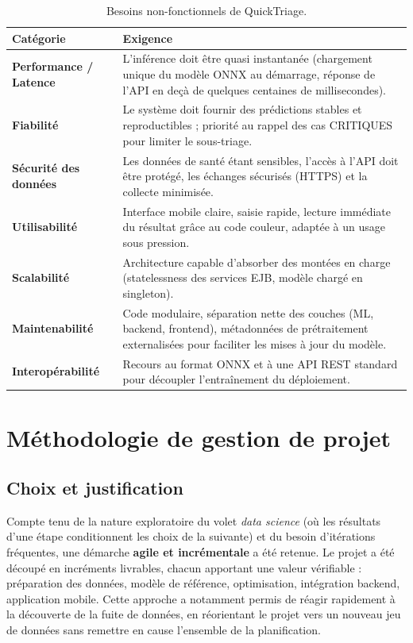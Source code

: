 \begin{table}[h]
\centering
\renewcommand{\arraystretch}{1.3}
\begin{tabular}{p{3.2cm} p{10.6cm}}
\toprule
\textbf{Catégorie} & \textbf{Exigence} \\
\midrule
\textbf{Performance / Latence} & L'inférence doit être quasi instantanée (chargement unique
du modèle ONNX au démarrage, réponse de l'API en deçà de quelques centaines de
millisecondes). \\
\textbf{Fiabilité} & Le système doit fournir des prédictions stables et reproductibles ;
priorité au rappel des cas CRITIQUES pour limiter le sous-triage. \\
\textbf{Sécurité des données} & Les données de santé étant sensibles, l'accès à l'API doit
être protégé, les échanges sécurisés (HTTPS) et la collecte minimisée. \\
\textbf{Utilisabilité} & Interface mobile claire, saisie rapide, lecture immédiate du
résultat grâce au code couleur, adaptée à un usage sous pression. \\
\textbf{Scalabilité} & Architecture capable d'absorber des montées en charge (statelessness
des services EJB, modèle chargé en singleton). \\
\textbf{Maintenabilité} & Code modulaire, séparation nette des couches (ML, backend,
frontend), métadonnées de prétraitement externalisées pour faciliter les mises à jour du
modèle. \\
\textbf{Interopérabilité} & Recours au format ONNX et à une API REST standard pour
découpler l'entraînement du déploiement. \\
\bottomrule
\end{tabular}
\caption{Besoins non-fonctionnels de QuickTriage.}
\label{tab:bnf}
\end{table}

\section{Méthodologie de gestion de projet}

\subsection{Choix et justification}
Compte tenu de la nature exploratoire du volet \textit{data science} (où les résultats
d'une étape conditionnent les choix de la suivante) et du besoin d'itérations fréquentes,
une démarche \textbf{agile et incrémentale} a été retenue. Le projet a été découpé en
incréments livrables, chacun apportant une valeur vérifiable : préparation des données,
modèle de référence, optimisation, intégration backend, application mobile. Cette approche a
notamment permis de réagir rapidement à la découverte de la fuite de données, en
réorientant le projet vers un nouveau jeu de données sans remettre en cause l'ensemble de la
planification.

